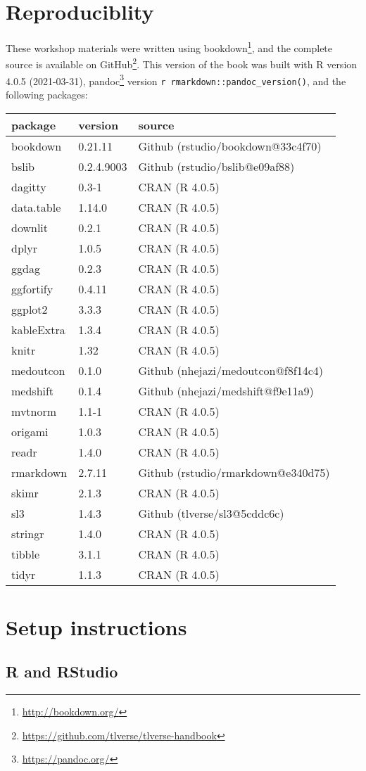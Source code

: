 \documentclass[
  12pt, krantz2,
]{book}
\renewcommand{\href}[2]{#2\footnote{\url{#1}}}
\theoremstyle{definition}
\theoremstyle{definition}
\theoremstyle{definition}
\newcommand{\1}{\mathbbm{1}}
\begin{document}
\hypertarget{repro}{%
\section{Reproduciblity}\label{repro}}

These workshop materials were written using \href{http://bookdown.org/}{bookdown},
and the complete source is available on
\href{https://github.com/tlverse/tlverse-handbook}{GitHub}. This version of the book
was built with R version 4.0.5 (2021-03-31), \href{https://pandoc.org/}{pandoc} version \texttt{r\ rmarkdown::pandoc\_version()}, and the following packages:

\begin{longtable}[]{@{}lll@{}}
\toprule
package & version & source\tabularnewline
\midrule
\endhead
bookdown & 0.21.11 & Github (rstudio/bookdown@33c4f70)\tabularnewline
bslib & 0.2.4.9003 & Github (rstudio/bslib@e09af88)\tabularnewline
dagitty & 0.3-1 & CRAN (R 4.0.5)\tabularnewline
data.table & 1.14.0 & CRAN (R 4.0.5)\tabularnewline
downlit & 0.2.1 & CRAN (R 4.0.5)\tabularnewline
dplyr & 1.0.5 & CRAN (R 4.0.5)\tabularnewline
ggdag & 0.2.3 & CRAN (R 4.0.5)\tabularnewline
ggfortify & 0.4.11 & CRAN (R 4.0.5)\tabularnewline
ggplot2 & 3.3.3 & CRAN (R 4.0.5)\tabularnewline
kableExtra & 1.3.4 & CRAN (R 4.0.5)\tabularnewline
knitr & 1.32 & CRAN (R 4.0.5)\tabularnewline
medoutcon & 0.1.0 & Github (nhejazi/medoutcon@f8f14c4)\tabularnewline
medshift & 0.1.4 & Github (nhejazi/medshift@f9e11a9)\tabularnewline
mvtnorm & 1.1-1 & CRAN (R 4.0.5)\tabularnewline
origami & 1.0.3 & CRAN (R 4.0.5)\tabularnewline
readr & 1.4.0 & CRAN (R 4.0.5)\tabularnewline
rmarkdown & 2.7.11 & Github (rstudio/rmarkdown@e340d75)\tabularnewline
skimr & 2.1.3 & CRAN (R 4.0.5)\tabularnewline
sl3 & 1.4.3 & Github (tlverse/sl3@5cddc6c)\tabularnewline
stringr & 1.4.0 & CRAN (R 4.0.5)\tabularnewline
tibble & 3.1.1 & CRAN (R 4.0.5)\tabularnewline
tidyr & 1.1.3 & CRAN (R 4.0.5)\tabularnewline
\bottomrule
\end{longtable}

\hypertarget{setup}{%
\section{Setup instructions}\label{setup}}

\hypertarget{r-and-rstudio}{%
\subsection{R and RStudio}\label{r-and-rstudio}}
\end{document}
